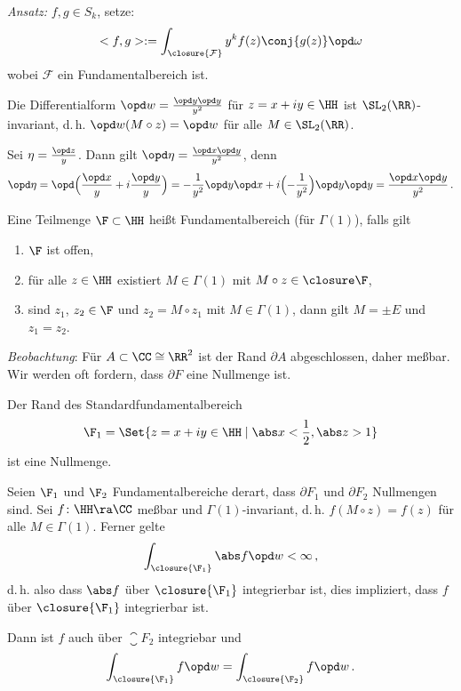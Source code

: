 \emph{Ansatz:} $f, g \in S_k$, setze:
\[
<f,g> := \int_{\closure{\mathcal F}} y^k f(z) \conj{g(z)} \opd \omega
\]
wobei $\mathcal F$ ein Fundamentalbereich ist.


\begin{satz}
	Die Differentialform $\opd w = \frac{\opd y \opd y}{y^2}$ für $z=x+iy\in\HH$ ist $\SL_2(\RR)$-invariant, d.\,h. $\opd w(M\circ z) = \opd w$ für alle $M\in\SL_2(\RR)$.
\end{satz}

\begin{beme}\label{beme:d_eta}
	Sei $\eta = \frac{\opd z}{y}$. Dann gilt $\opd \eta = \frac{\opd x \opd y}{y^2}$, denn
	\[
		\opd \eta
		= \opd \Bigl(\frac{\opd x}{y} + i\frac{\opd y}{y}\Bigr)
		= -\frac{1}{y^2} \opd y \opd x + i\Bigl(-\frac{1}{y^2}\Bigr) \opd y \opd y
		= \frac{\opd x \opd y}{y^2}
		\,.
	\]
\end{beme}

\begin{erin}
	Eine Teilmenge $\F \subset \HH$ heißt Fundamentalbereich (für $\Gamma(1)$), falls gilt
	\begin{enumerate}
		\item $\F$ ist offen,
		\item für alle $z\in\HH$ existiert $M \in \Gamma(1)$ mit $M \circ z \in \closure \F$,
		\item sind $z_1$, $z_2 \in \F$ und $z_2 = M \circ z_1$ mit $M \in \Gamma(1)$, dann gilt $M = \pm E$ und $z_1 = z_2$.
	\end{enumerate}
\end{erin}

\emph{Beobachtung}: Für $A \subset \CC \cong \RR^2$ ist der Rand $\partial A$ abgeschlossen, daher meßbar. Wir werden oft fordern, dass $\partial F$ eine Nullmenge ist.

\begin{bsp}\label{bsp:fundamentalbereich}
	Der Rand des Standardfundamentalbereich \[\F_1 = \Set{z = x+iy\in\HH \mid \abs x < \frac{1}{2}, \abs z > 1}\] ist eine Nullmenge.
\end{bsp}

\begin{satz}\label{satz:int_fundamentalbereich_invariant}
	Seien $\F_1$ und $\F_2$ Fundamentalbereiche derart, dass $\partial F_1$ und $\partial F_2$ Nullmengen sind.
	Sei $f\colon \HH \ra \CC$ meßbar und $\Gamma(1)$-invariant, d.\,h. $f(M \circ z) = f(z)$ für alle $M \in \Gamma(1)$.
	Ferner gelte \[\int_{\closure{\F_1}} \abs f \opd w < \infty\,,\] d.\,h. also dass $\abs f$ über $\closure{\F_1}$ integrierbar ist, dies impliziert, dass $f$ über $\closure{\F_1}$ integrierbar ist.
	
	Dann ist $f$ auch über $\closure{F_2}$ integriebar und
	\[
		\int_{\closure{\F_1}} f \opd w
		= \int_{\closure{\F_2}} f \opd w
		\,.
	\]
\end{satz}

